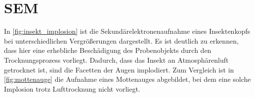 \section{SEM}




In \cref{fig:insekt_implosion} ist die Sekundärelektronenaufnahme eines Insektenkopfs bei unterschiedlichen Vergrößerungen dargestellt.
Es ist deutlich zu erkennen, dass hier eine erhebliche Beschädigung des Probenobjekts durch den Trocknungsprozess vorliegt.
Dadurch, dass das Insekt an Atmosphärenluft getrocknet ist, sind die Facetten der Augen implodiert.
Zum Vergleich ist in \cref{fig:mottenauge} die Aufnahme eines Mottenauges abgebildet, bei dem eine solche Implosion trotz Lufttrocknung nicht vorliegt.



